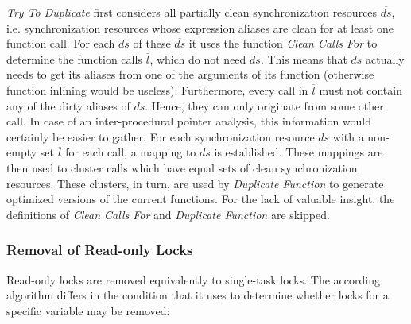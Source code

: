 \textit{Try To Duplicate} first considers all partially clean synchronization resources $\overline{ds}$, i.e. synchronization resources whose expression aliases are clean for at least one function call. For each $ds$ of these $\overline{ds}$ it uses the function \textit{Clean Calls For} to determine the function calls $\overline{l}$, which do not need $ds$. This means that $ds$ actually needs to get its aliases from one of the arguments of its function (otherwise function inlining would be useless). Furthermore, every call in $\overline{l}$ must not contain any of the dirty aliases of $ds$. Hence, they can only originate from some other call. In case of an inter-procedural pointer analysis, this information would certainly be easier to gather. For each synchronization resource $ds$ with a non-empty set $\overline{l}$ for each call, a mapping to $ds$ is established. These mappings are then used to cluster calls which have equal sets of clean synchronization resources. These clusters, in turn, are used by \textit{Duplicate Function} to generate optimized versions of the current functions. For the lack of valuable insight, the definitions of \textit{Clean Calls For} and \textit{Duplicate Function} are skipped.

\subsubsection{Removal of Read-only Locks}
Read-only locks are removed equivalently to single-task locks. The according algorithm differs in the condition that it uses to determine whether locks for a specific variable may be removed: 

\vspace{4mm}

